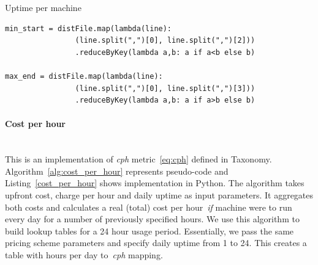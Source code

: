 \documentclass[]{final_report}
\newcommand{\myparagraph}[1]{\paragraph{#1}\mbox{}\\}
\begin{document}
\begin{algorithm}[h]
\caption{Uptime per machine}
\label{alg:uptime_per_machine}
 \algrenewcommand{}
 \algrenewcommand{}
\end{algorithm}

\begin{minipage}{\linewidth}
\begin{lstlisting}[label={uptime_per_machine_implementation},caption={Uptime per machine implementation in Apache Spark},frame=single] 
min_start = distFile.map(lambda(line): 
                (line.split(",")[0], line.split(",")[2]))
                .reduceByKey(lambda a,b: a if a<b else b)

max_end = distFile.map(lambda(line): 
                (line.split(",")[0], line.split(",")[3]))
                .reduceByKey(lambda a,b: a if a>b else b)
\end{lstlisting}
\end{minipage}

\myparagraph{Cost per hour}

This is an implementation of \textit{cph} metric~\ref{eq:cph} defined in Taxonomy. Algorithm~\ref{alg:cost_per_hour} represents pseudo-code and Listing~\ref{cost_per_hour} shows implementation in Python. 
The algorithm takes upfront cost, charge per hour and daily uptime as input parameters. It aggregates both costs and calculates a real (total) cost per hour~\textit{if} machine were to run every day for a number of previously specified hours. We use this algorithm to build lookup tables for a 24 hour usage period. Essentially, we pass the same pricing scheme parameters and specify daily uptime from 1 to 24. This creates a table with hours per day to~\textit{cph} mapping.
\end{document}
